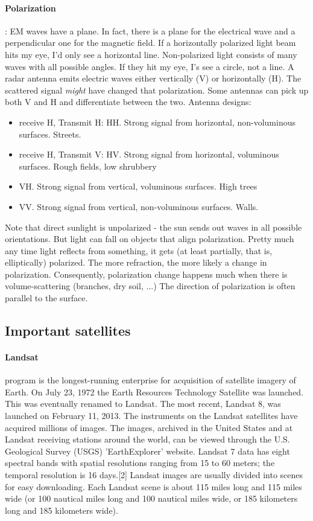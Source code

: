 \paragraph{Polarization}: EM waves have a plane. In fact, there is a plane for the electrical wave and a perpendicular one for the magnetic field.
If a horizontally polarized light beam hits my eye, I'd only see a horizontal line. Non-polarized light consists of many waves with all possible angles. If they hit my eye, I's see a circle, not a line.
A radar antenna emits electric waves either vertically (V) or horizontally (H). The scattered signal \emph{might} have changed that polarization. Some antennas can pick up both V and H and differentiate between the two.
Antenna designs:
\begin{itemize}
    \item receive H, Transmit H: HH. Strong signal from horizontal, non-voluminous surfaces. Streets.
    \item receive H, Transmit V: HV. Strong signal from horizontal, voluminous surfaces. Rough fields, low shrubbery
    \item VH. Strong signal from vertical, voluminous surfaces. High trees
    \item VV. Strong signal from vertical, non-voluminous surfaces. Walls.
\end{itemize}
Note that direct sunlight is unpolarized - the sun sends out waves in all possible orientations.
But light can fall on objects that align polarization. Pretty much any time light reflects from something, it gets (at least partially, that is, elliptically) polarized.
The more refraction, the more likely a change in polarization. Consequently, polarization change happens much when there is volume-scattering (branches, dry soil, ...)
The direction of polarization is often parallel to the surface.





\subsection{Important satellites}

\paragraph{Landsat} program is the longest-running enterprise for acquisition of satellite imagery of Earth.
On July 23, 1972 the Earth Resources Technology Satellite was launched. This was eventually renamed to Landsat. 
The most recent, Landsat 8, was launched on February 11, 2013. The instruments on the Landsat satellites have acquired millions of images.
The images, archived in the United States and at Landsat receiving stations around the world,
 can be viewed through the U.S. Geological Survey (USGS) 'EarthExplorer' website.
 Landsat 7 data has eight spectral bands with spatial resolutions ranging from 15 to 60 meters;
 the temporal resolution is 16 days.[2] Landsat images are usually divided into scenes for easy downloading.
 Each Landsat scene is about 115 miles long and 115 miles wide (or 100 nautical miles long and 100 nautical miles wide, or 185 kilometers long and 185 kilometers wide).


